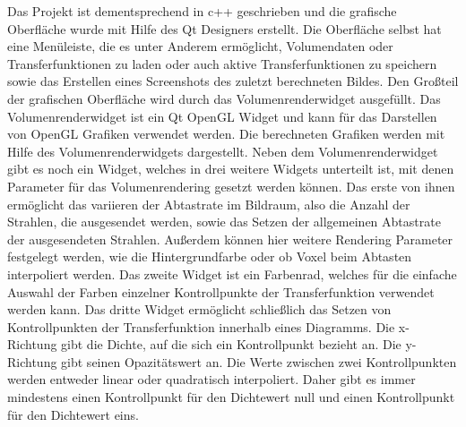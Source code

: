 Das Projekt ist dementsprechend in c++ geschrieben und die grafische Oberfläche wurde mit Hilfe des Qt Designers erstellt.
Die Oberfläche selbst hat eine Menüleiste, die es unter Anderem ermöglicht, Volumendaten oder Transferfunktionen zu laden oder auch aktive Transferfunktionen zu speichern sowie das Erstellen eines Screenshots des zuletzt berechneten Bildes.
Den Großteil der grafischen Oberfläche wird durch das Volumenrenderwidget ausgefüllt.
Das Volumenrenderwidget ist ein Qt OpenGL Widget und kann für das Darstellen von OpenGL Grafiken verwendet werden.
Die berechneten Grafiken werden mit Hilfe des Volumenrenderwidgets dargestellt.
Neben dem Volumenrenderwidget gibt es noch ein Widget, welches in drei weitere Widgets unterteilt ist, mit denen Parameter für das Volumenrendering gesetzt werden können.
Das erste von ihnen ermöglicht das variieren der Abtastrate im Bildraum, also die Anzahl der Strahlen, die ausgesendet werden, sowie das Setzen der allgemeinen Abtastrate der ausgesendeten Strahlen.
Außerdem können hier weitere Rendering Parameter festgelegt werden, wie die Hintergrundfarbe oder ob Voxel beim Abtasten interpoliert werden.
Das zweite Widget ist ein Farbenrad, welches für die einfache Auswahl der Farben einzelner Kontrollpunkte der Transferfunktion verwendet werden kann.
Das dritte Widget ermöglicht schließlich das Setzen von Kontrollpunkten der Transferfunktion innerhalb eines Diagramms.
Die x-Richtung gibt die Dichte, auf die sich ein Kontrollpunkt bezieht an.
Die y-Richtung gibt seinen Opazitätswert an.
Die Werte zwischen zwei Kontrollpunkten werden entweder linear oder quadratisch interpoliert.
Daher gibt es immer mindestens einen Kontrollpunkt für den Dichtewert null und einen Kontrollpunkt für den Dichtewert eins.

